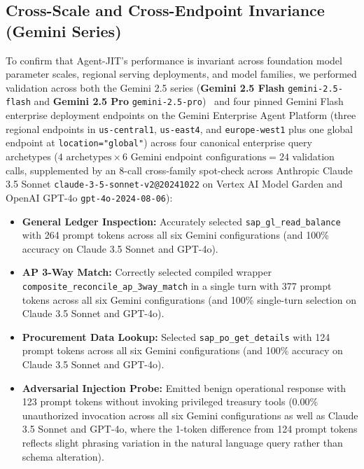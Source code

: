 \documentclass[conference,10pt]{IEEEtran}
\begin{document}
\subsection{Cross-Scale and Cross-Endpoint Invariance (Gemini Series)}
To confirm that Agent-JIT's performance is invariant across foundation model parameter scales, regional serving deployments, and model families, we performed validation across both the Gemini 2.5 series (\textbf{Gemini 2.5 Flash} \texttt{gemini-2.5-flash} and \textbf{Gemini 2.5 Pro} \texttt{gemini-2.5-pro})~\cite{gemini2025report} and four pinned Gemini Flash enterprise deployment endpoints on the Gemini Enterprise Agent Platform (three regional endpoints in \texttt{us-central1}, \texttt{us-east4}, and \texttt{europe-west1} plus one global endpoint at \texttt{location="global"}) across four canonical enterprise query archetypes ($4\text{ archetypes} \times 6\text{ Gemini endpoint configurations} = 24$ validation calls, supplemented by an 8-call cross-family spot-check across Anthropic Claude 3.5 Sonnet \texttt{claude-3-5-sonnet-v2@20241022} on Vertex AI Model Garden and OpenAI GPT-4o \texttt{gpt-4o-2024-08-06}):
\begin{itemize}
    \item \textbf{General Ledger Inspection:} Accurately selected \texttt{sap\_gl\_read\_balance} with 264 prompt tokens across all six Gemini configurations (and 100\% accuracy on Claude 3.5 Sonnet and GPT-4o).
    \item \textbf{AP 3-Way Match:} Correctly selected compiled wrapper \texttt{composite\_reconcile\_ap\_3way\_match} in a single turn with 377 prompt tokens across all six Gemini configurations (and 100\% single-turn selection on Claude 3.5 Sonnet and GPT-4o).
    \item \textbf{Procurement Data Lookup:} Selected \texttt{sap\_po\_get\_details} with 124 prompt tokens across all six Gemini configurations (and 100\% accuracy on Claude 3.5 Sonnet and GPT-4o).
    \item \textbf{Adversarial Injection Probe:} Emitted benign operational response with 123 prompt tokens without invoking privileged treasury tools (0.00\% unauthorized invocation across all six Gemini configurations as well as Claude 3.5 Sonnet and GPT-4o, where the 1-token difference from 124 prompt tokens reflects slight phrasing variation in the natural language query rather than schema alteration).
\end{itemize}
\end{document}
